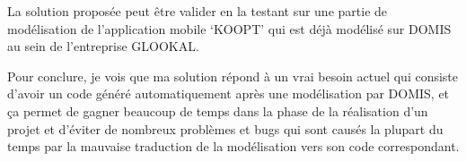 \documentclass[a4paper,12pt]{article}
\begin{document}
La solution proposée peut être valider en la testant sur une partie de modélisation de l’application mobile ‘KOOPT’ qui est déjà modélisé sur DOMIS au sein de l’entreprise GLOOKAL.

\vspace{0,5cm}

Pour conclure, je vois que ma solution répond à un vrai besoin actuel qui consiste d’avoir un code généré automatiquement après une modélisation par DOMIS, et ça permet de gagner beaucoup de temps dans la phase de la réalisation d’un projet et d’éviter de nombreux problèmes et bugs qui sont causés la plupart du temps par la mauvaise traduction de la modélisation vers son code correspondant.
\end{document}
